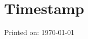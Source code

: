\listoftables
\listoffigures


\clearpage
\chapter*{Timestamp}
\vfill
\begin{center}

Printed on: \today

\end{center}